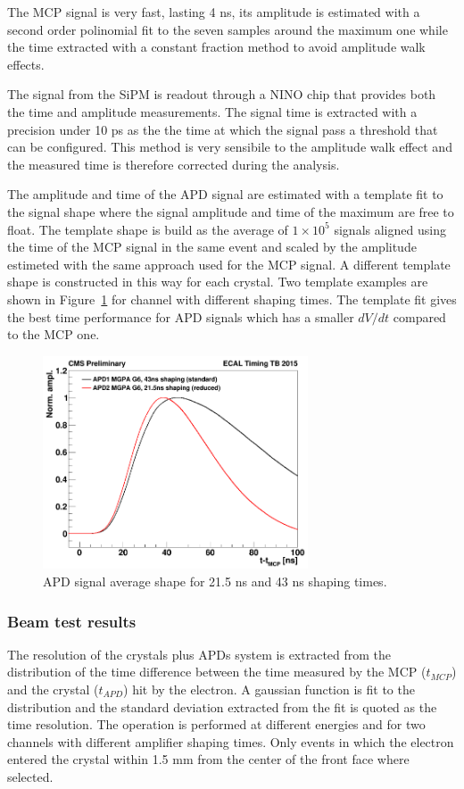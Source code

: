 The MCP signal is very fast, lasting 4 ns, its amplitude is estimated with a second order polinomial fit to the seven samples
around the maximum one while the time extracted with a constant fraction method to avoid amplitude walk effects.

The signal from the SiPM is readout through a NINO chip that provides both the time and amplitude measurements.
The signal time is extracted with a precision under 10 ps as the the time at which the signal pass a threshold that
can be configured. This method is very sensibile to the amplitude walk effect and the measured time is therefore
corrected during the analysis.

The amplitude and time of the APD signal are estimated with a template fit to the signal shape where the signal
amplitude and time of the maximum are free to float.
The template shape is build as the average of $1\times 10^5$ signals aligned using the time of the MCP signal
in the same event and scaled by the amplitude estimeted with the same approach used for the MCP signal.
A different template shape is constructed in this way
for each crystal. Two template examples are shown in Figure~\ref{fig:apd_templates} for channel with different  
shaping times. The template fit gives the best time performance for APD signals which has a smaller $dV/dt$ compared
to the MCP one.

\begin{figure}
  \centering
  \includegraphics[width = 0.7\textwidth]{figures/upgrade/wf_shaping_times.png}
  \caption{APD signal average shape for 21.5 ns and 43 ns shaping times.}
  \label{fig:apd_templates}
\end{figure}

\subsubsection{Beam test results}
\label{sec:tb_2015_results}
The resolution of the \PbWO crystals plus APDs system is extracted from 
the distribution of the time difference between the time measured by the MCP ($t_{MCP}$) and the crystal ($t_{APD}$)
hit by the electron.
A gaussian function is fit to the distribution and the standard deviation extracted from the fit is quoted as
the time resolution. The operation is performed at different energies and for two channels with different
amplifier shaping times. Only events in which the electron entered the crystal within 1.5 mm from the center of the
front face where selected. 

